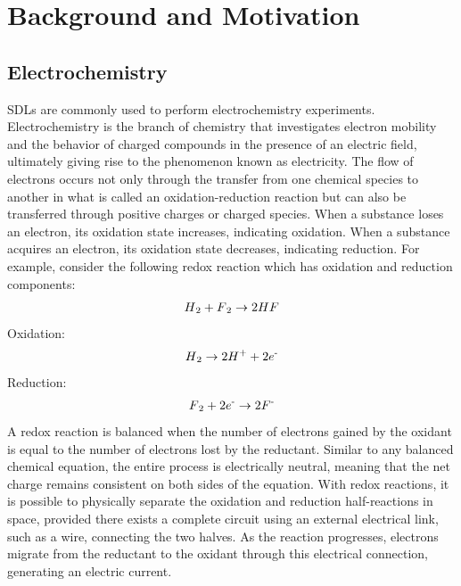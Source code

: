 \chapter{Background and Motivation} \label{chap:chap-1}



\section{Electrochemistry}
SDLs are commonly used to perform electrochemistry experiments. Electrochemistry is the branch of chemistry that investigates electron mobility and the behavior of charged compounds in the presence of an electric field, ultimately giving rise to the phenomenon known as electricity.  The flow of electrons occurs not only through the transfer from one chemical species to another in what is called an oxidation-reduction reaction but can also be transferred through positive charges or charged species. When a substance loses an electron, its oxidation state increases, indicating oxidation. When a substance acquires an electron, its oxidation state decreases, indicating reduction. For example, consider the following redox reaction which has oxidation and reduction components:
\begin{align}
H\textsubscript{2} + F\textsubscript{2} \to 2HF
\end{align}
Oxidation:
\begin{align}
H\textsubscript{2} \to 2H\textsuperscript{+} + 2e\textsuperscript{-}
\end{align}
Reduction:
\begin{align}
F\textsubscript{2} + 2e\textsuperscript{-} \to 2F\textsuperscript{-}
\end{align}
A redox reaction is balanced when the number of electrons gained by the oxidant is equal to the number of electrons lost by the reductant. Similar to any balanced chemical equation, the entire process is electrically neutral, meaning that the net charge remains consistent on both sides of the equation.
With redox reactions, it is possible to physically separate the oxidation and reduction half-reactions in space, provided there exists a complete circuit using an external electrical link, such as a wire, connecting the two halves. As the reaction progresses, electrons migrate from the reductant to the oxidant through this electrical connection, generating an electric current. 

